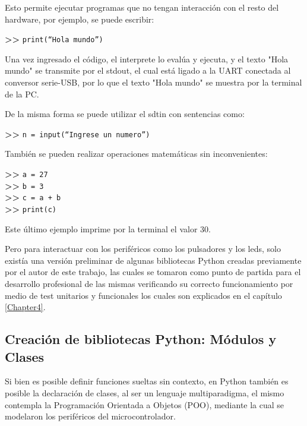 Esto permite ejecutar programas que no tengan interacción con el resto del hardware, por ejemplo, se puede escribir:

\textbf{{\fontsize{16}{16}\selectfont \textgreater\textgreater}} \texttt{print(“Hola mundo”)}

Una vez ingresado el código, el interprete lo evalúa y ejecuta, y el texto "Hola mundo" se transmite por el stdout, el cual está ligado a la UART conectada al conversor serie-USB, por lo que el texto "Hola mundo" se muestra por la terminal de la PC.

De la misma forma se puede utilizar el sdtin con sentencias como:

\textbf{{\fontsize{16}{16}\selectfont \textgreater\textgreater}} \texttt{n = input(“Ingrese un numero”)}

También se pueden realizar operaciones matemáticas sin inconvenientes:

\textbf{{\fontsize{16}{16}\selectfont \textgreater\textgreater}} \texttt{a = 27}\\
\textbf{{\fontsize{16}{16}\selectfont \textgreater\textgreater}} \texttt{b = 3}\\
\textbf{{\fontsize{16}{16}\selectfont \textgreater\textgreater}} \texttt{c = a + b}\\
\textbf{{\fontsize{16}{16}\selectfont \textgreater\textgreater}} \texttt{print(c)}

Este último ejemplo imprime por la terminal el valor 30.

Pero para interactuar con los periféricos como los pulsadores y los leds, solo existía una versión preliminar de algunas bibliotecas Python creadas previamente por el autor de este trabajo, las cuales se tomaron como punto de partida para el desarrollo profesional de las mismas verificando su correcto funcionamiento por medio de test unitarios y funcionales los cuales son explicados en el capítulo \ref{Chapter4}.


\subsection{Creación de bibliotecas Python: Módulos y Clases} 

Si bien es posible definir funciones sueltas sin contexto, en Python también es posible la declaración de clases, al ser un lenguaje multiparadigma, el mismo contempla la Programación Orientada a Objetos (POO), mediante la cual se modelaron los periféricos del microcontrolador.

